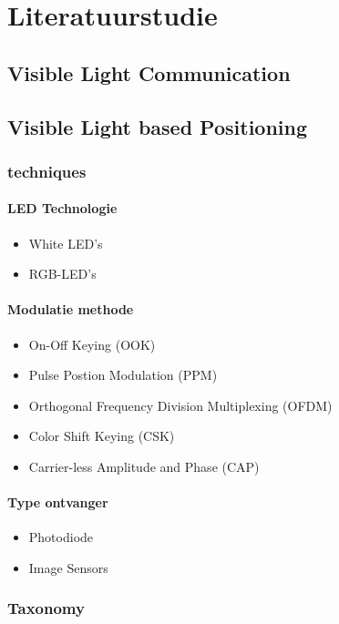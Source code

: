 \chapter{Literatuurstudie}
\section{Visible Light Communication}
\section{Visible Light based Positioning}
	\subsection{techniques}
		\subsubsection{LED Technologie}
			\begin{itemize}
				\item White LED's
				\item RGB-LED's
			\end{itemize}
		\subsubsection{Modulatie methode}
			\begin{itemize}
				\item On-Off Keying (OOK)
				\item Pulse Postion Modulation (PPM)
				\item Orthogonal Frequency Division Multiplexing (OFDM)
				\item Color Shift Keying (CSK)
				\item Carrier-less Amplitude and Phase (CAP)
			\end{itemize}
		\subsubsection{Type ontvanger}
			\begin{itemize}
				\item Photodiode
				\item Image Sensors
			\end{itemize}
	\subsection{Taxonomy}
